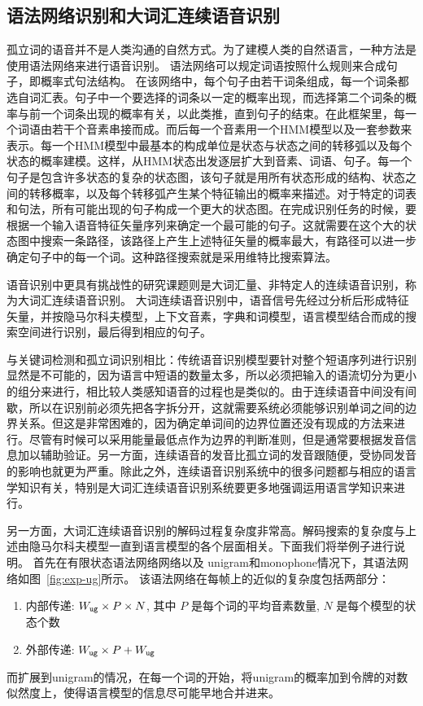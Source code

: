 \subsection{语法网络识别和大词汇连续语音识别}
\label{chap:intro-lvcsr}

孤立词的语音并不是人类沟通的自然方式。为了建模人类的自然语言，一种方法是使用语法网络来进行语音识别。
语法网络可以规定词语按照什么规则来合成句子，即概率式句法结构。
在该网络中，每个句子由若干词条组成，每一个词条都选自词汇表。句子中一个要选择的词条以一定的概率出现，而选择第二个词条的概率与前一个词条出现的概率有关，以此类推，直到句子的结束。在此框架里，每一个词语由若干个音素串接而成。而后每一个音素用一个HMM模型以及一套参数来表示。每一个HMM模型中最基本的构成单位是状态与状态之间的转移弧以及每个状态的概率建模。这样，从HMM状态出发逐层扩大到音素、词语、句子。每一个句子是包含许多状态的复杂的状态图，该句子就是用所有状态形成的结构、状态之间的转移概率，以及每个转移弧产生某个特征输出的概率来描述。对于特定的词表和句法，所有可能出现的句子构成一个更大的状态图。在完成识别任务的时候，要根据一个输入语音特征矢量序列来确定一个最可能的句子。这就需要在这个大的状态图中搜索一条路径，该路径上产生上述特征矢量的概率最大，有路径可以进一步确定句子中的每一个词。这种路径搜索就是采用维特比搜索算法。

语音识别中更具有挑战性的研究课题则是大词汇量、非特定人的连续语音识别，称为大词汇连续语音识别。
大词连续语音识别中，语音信号先经过分析后形成特征矢量，并按隐马尔科夫模型，上下文音素，字典和词模型，语言模型结合而成的搜索空间进行识别，最后得到相应的句子。

与关键词检测和孤立词识别相比：传统语音识别模型要针对整个短语序列进行识别显然是不可能的，因为语言中短语的数量太多，所以必须把输入的语流切分为更小的组分来进行，相比较人类感知语音的过程也是类似的。由于连续语音中间没有间歇，所以在识别前必须先把各字拆分开，这就需要系统必须能够识别单词之间的边界关系。但这是非常困难的，因为确定单词间的边界位置还没有现成的方法来进行。尽管有时候可以采用能量最低点作为边界的判断准则，但是通常要根据发音信息加以辅助验证。另一方面，连续语音的发音比孤立词的发音跟随便，受协同发音的影响也就更为严重。除此之外，连续语音识别系统中的很多问题都与相应的语言学知识有关，特别是大词汇连续语音识别系统要更多地强调运用语言学知识来进行。

另一方面，大词汇连续语音识别的解码过程复杂度非常高。解码搜索的复杂度与上述由隐马尔科夫模型一直到语言模型的各个层面相关。下面我们将举例子进行说明。
首先在有限状态语法网络网络以及 unigram和monophone情况下，其语法网络如图~\ref{fig:exp-ug}所示。
该语法网络在每帧上的近似的复杂度包括两部分：
\begin{enumerate}
\item 内部传递: $W_{\tt ug}\times P\times N$, 其中 $P$ 是每个词的平均音素数量, $N$ 是每个模型的状态个数
\item 外部传递: $W_{\tt ug}\times P + W_{\tt ug}$ 
\end{enumerate}
而扩展到unigram的情况，在每一个词的开始，将unigram的概率加到令牌的对数似然度上，使得语言模型的信息尽可能早地合并进来。

